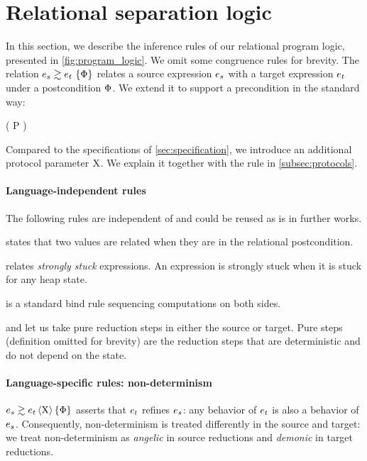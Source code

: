 \section{Relational separation logic}
\label{sec:program_logic}



In this section, we describe the inference rules of our relational program logic, presented in \cref{fig:program_logic}.
We omit some congruence rules for brevity.
The relation $\iSimv{\iPred}{\datalangExpr_s}{\datalangExpr_t}$ relates a source expression $\datalangExpr_s$ with a target expression $\datalangExpr_t$ under a postcondition $\Phi$.
We extend it to support a precondition in the standard way:
\begin{mathline}
    \coloneqq
    \iPersistent \left( P \iWand {} \right)
\end{mathline}

Compared to the specifications of \cref{sec:specification}, we introduce an additional protocol parameter $\mathrm{X}$.
We explain it together with the  rule in \cref{subsec:protocols}.

\paragraph{Language-independent rules}
The following rules are independent of \DataLang and could be reused as is in further works.

 states that two values are related when they are in the relational postcondition.

 relates \emph{strongly stuck} expressions.
An expression is strongly stuck when it is stuck for any heap state.

 is a standard bind rule sequencing computations on both sides.

 and  let us take pure reduction steps in either the source or target.
Pure steps (definition omitted for brevity) are the reduction steps that are deterministic and do not depend on the state.

\paragraph{Language-specific rules: non-determinism}
$\iSimv[\iProt]{\iPred}{\datalangExpr_s}{\datalangExpr_t}$ asserts that $\datalangExpr_t$ refines $\datalangExpr_s$: any behavior of $\datalangExpr_t$ is also a behavior of $\datalangExpr_s$.
Consequently, non-determinism is treated differently in the source and target: we treat non-determinism as \emph{angelic} in source reductions and \emph{demonic} in target reductions.

